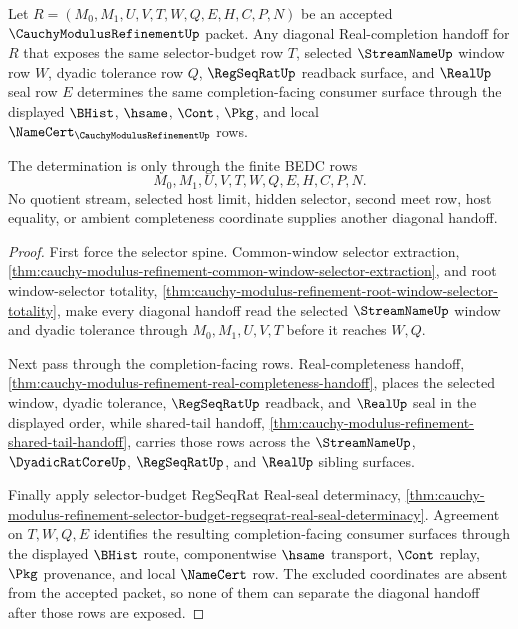\begin{theorem}
\label{thm:cauchy-modulus-refinement-diagonal-handoff-determinacy}
Let $R=(M_0,M_1,U,V,T,W,Q,E,H,C,P,N)$ be an accepted $\CauchyModulusRefinementUp$ packet. Any diagonal Real-completion handoff for $R$ that exposes the same selector-budget row $T$, selected $\StreamNameUp$ window row $W$, dyadic tolerance row $Q$, $\RegSeqRatUp$ readback surface, and $\RealUp$ seal row $E$ determines the same completion-facing consumer surface through the displayed $\BHist$, $\hsame$, $\Cont$, $\Pkg$, and local $\NameCert_{\CauchyModulusRefinementUp}$ rows.

The determination is only through the finite BEDC rows
$$
M_0,M_1,U,V,T,W,Q,E,H,C,P,N.
$$
No quotient stream, selected host limit, hidden selector, second meet row, host equality, or ambient completeness coordinate supplies another diagonal handoff.
\end{theorem}
\begin{proof}
First force the selector spine. Common-window selector extraction, \autoref{thm:cauchy-modulus-refinement-common-window-selector-extraction}, and root window-selector totality, \autoref{thm:cauchy-modulus-refinement-root-window-selector-totality}, make every diagonal handoff read the selected $\StreamNameUp$ window and dyadic tolerance through $M_0,M_1,U,V,T$ before it reaches $W,Q$.

Next pass through the completion-facing rows. Real-completeness handoff, \autoref{thm:cauchy-modulus-refinement-real-completeness-handoff}, places the selected window, dyadic tolerance, $\RegSeqRatUp$ readback, and $\RealUp$ seal in the displayed order, while shared-tail handoff, \autoref{thm:cauchy-modulus-refinement-shared-tail-handoff}, carries those rows across the $\StreamNameUp$, $\DyadicRatCoreUp$, $\RegSeqRatUp$, and $\RealUp$ sibling surfaces.

Finally apply selector-budget RegSeqRat Real-seal determinacy, \autoref{thm:cauchy-modulus-refinement-selector-budget-regseqrat-real-seal-determinacy}. Agreement on $T,W,Q,E$ identifies the resulting completion-facing consumer surfaces through the displayed $\BHist$ route, componentwise $\hsame$ transport, $\Cont$ replay, $\Pkg$ provenance, and local $\NameCert$ row. The excluded coordinates are absent from the accepted packet, so none of them can separate the diagonal handoff after those rows are exposed.
\end{proof}

